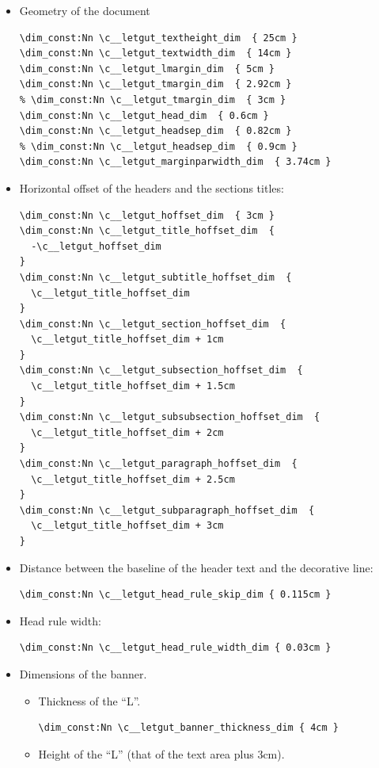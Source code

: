 \documentclass{letgut}
\begin{document}
\begin{itemize}
\item Geometry of the document
\begin{lstlisting}
\dim_const:Nn \c__letgut_textheight_dim  { 25cm }
\dim_const:Nn \c__letgut_textwidth_dim  { 14cm }
\dim_const:Nn \c__letgut_lmargin_dim  { 5cm }
\dim_const:Nn \c__letgut_tmargin_dim  { 2.92cm }
% \dim_const:Nn \c__letgut_tmargin_dim  { 3cm }
\dim_const:Nn \c__letgut_head_dim  { 0.6cm }
\dim_const:Nn \c__letgut_headsep_dim  { 0.82cm }
% \dim_const:Nn \c__letgut_headsep_dim  { 0.9cm }
\dim_const:Nn \c__letgut_marginparwidth_dim  { 3.74cm }
\end{lstlisting}
\item Horizontal offset of the headers and the sections titles:
\begin{lstlisting}
\dim_const:Nn \c__letgut_hoffset_dim  { 3cm }
\dim_const:Nn \c__letgut_title_hoffset_dim  {
  -\c__letgut_hoffset_dim
}
\dim_const:Nn \c__letgut_subtitle_hoffset_dim  {
  \c__letgut_title_hoffset_dim
}
\dim_const:Nn \c__letgut_section_hoffset_dim  {
  \c__letgut_title_hoffset_dim + 1cm
}
\dim_const:Nn \c__letgut_subsection_hoffset_dim  {
  \c__letgut_title_hoffset_dim + 1.5cm
}
\dim_const:Nn \c__letgut_subsubsection_hoffset_dim  {
  \c__letgut_title_hoffset_dim + 2cm
}
\dim_const:Nn \c__letgut_paragraph_hoffset_dim  {
  \c__letgut_title_hoffset_dim + 2.5cm
}
\dim_const:Nn \c__letgut_subparagraph_hoffset_dim  {
  \c__letgut_title_hoffset_dim + 3cm
}
\end{lstlisting}
\item Distance between the baseline of the header text and the decorative line:
\begin{lstlisting}
\dim_const:Nn \c__letgut_head_rule_skip_dim { 0.115cm }
\end{lstlisting}
\item Head rule width:
\begin{lstlisting}
\dim_const:Nn \c__letgut_head_rule_width_dim { 0.03cm }
\end{lstlisting}
\item Dimensions of the banner.
\begin{itemize}
\item Thickness of the “L”.
\begin{lstlisting}
\dim_const:Nn \c__letgut_banner_thickness_dim { 4cm }
\end{lstlisting}
\item Height of the “L” (that of the text area plus 3cm).
\begin{lstlisting}

\end{lstlisting}
\end{itemize}
\end{itemize}
\end{document}
